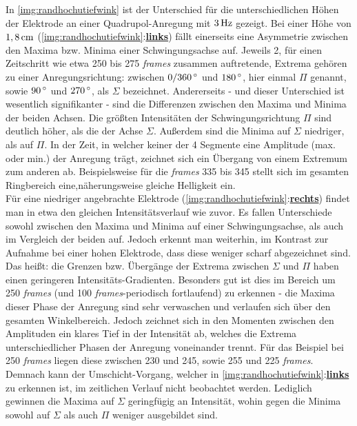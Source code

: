 \documentclass[numbers=noenddot,a4paper]{scrartcl}
\newcommand{\degree}{^\circ}
\newcommand{\tilt}[1]{\textit{#1}}
\newcommand{\fett}[1]{\textbf{#1}}
\begin{document}
	        In \ref{img:randhochutiefwink} ist der Unterschied für die unterschiedlichen Höhen der Elektrode an einer Quadrupol-Anregung mit $\unit[3]{Hz}$ gezeigt. Bei einer Höhe von $\unit[1,8]{cm}$ (\ref{img:randhochutiefwink}:\underline{\fett{links}}) fällt einerseits eine Asymmetrie zwischen den Maxima bzw. Minima einer Schwingungsachse auf. Jeweils 2, für einen Zeitschritt wie etwa 250 bis 275 \tilt{frames} zusammen auftretende, Extrema gehören zu einer Anregungsrichtung: zwischen $\unit[0/360]{\degree}$ und $\unit[180]{\degree}$, hier einmal $\Pi$ genannt, sowie $\unit[90]{\degree}$ und $\unit[270]{\degree}$, als $\Sigma$ bezeichnet. Andererseits - und dieser Unterschied ist wesentlich signifikanter - sind die Differenzen zwischen den Maxima und Minima der beiden Achsen. Die größten Intensitäten der Schwingungsrichtung $\Pi$ sind deutlich höher, als die der Achse $\Sigma$. Außerdem sind die Minima auf $\Sigma$ niedriger, als auf $\Pi$. In der Zeit, in welcher keiner der 4 Segmente eine Amplitude (max. oder min.) der Anregung trägt, zeichnet sich ein Übergang von einem Extremum zum anderen ab. Beispielsweise für die \tilt{frames} 335 bis 345 stellt sich im gesamten Ringbereich eine,näherungsweise gleiche Helligkeit ein.\\
			Für eine niedriger angebrachte Elektrode (\ref{img:randhochutiefwink}:\underline{\fett{rechts}}) findet man in etwa den gleichen Intensitätsverlauf wie zuvor. Es fallen Unterschiede sowohl zwischen den Maxima und Minima auf einer Schwingungsachse, als auch im Vergleich der beiden auf. Jedoch erkennt man weiterhin, im Kontrast zur Aufnahme bei einer hohen Elektrode, dass diese weniger scharf abgezeichnet sind. Das heißt: die Grenzen bzw. Übergänge der Extrema zwischen $\Sigma$ und $\Pi$ haben einen geringeren Intensitäts-Gradienten. Besonders gut ist dies im Bereich um 250 \tilt{frames} (und 100 \tilt{frames}-periodisch fortlaufend) zu erkennen - die Maxima dieser Phase der Anregung sind sehr verwaschen und verlaufen sich über den gesamten Winkelbereich. Jedoch zeichnet sich in den Momenten zwischen den Amplituden ein klares Tief in der Intensität ab, welches die Extrema unterschiedlicher Phasen der Anregung voneinander trennt. Für das Beispiel bei 250 \tilt{frames} liegen diese zwischen 230 und 245, sowie 255 und 225 \tilt{frames}. Demnach kann der Umschicht-Vorgang, welcher in \ref{img:randhochutiefwink}:\underline{\fett{links}} zu erkennen ist, im zeitlichen Verlauf nicht beobachtet werden. Lediglich gewinnen die Maxima auf $\Sigma$ geringfügig an Intensität, wohin gegen die Minima sowohl auf $\Sigma$ als auch $\Pi$ weniger ausgebildet sind.
\end{document}
